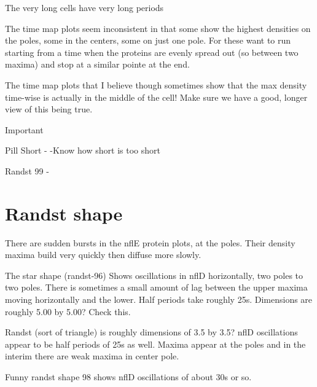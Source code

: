 \documentclass[letterpaper,twocolumn,amsmath,amssymb,pre]{revtex4-1}
\begin{document}
The very long cells have very long periods

The time map plots seem inconsistent in that some show the highest
densities on the poles, some in the centers, some on just one pole.
For these want to run starting from a time when the proteins are
evenly spread out (so between two maxima) and stop at a similar pointe
at the end.

The time map plots that I believe though sometimes show that the max
density time-wise is actually in the middle of the cell!  Make sure we
have a good, longer view of this being true.


Important


Pill Short -
     -Know how short is too short

Randst 99 -

\section{Randst shape}
There are sudden bursts in the nflE protein plots, at the poles. Their
density maxima build very quickly then diffuse more slowly. 

The star shape (randst-96) Shows oscillations in nflD horizontally, two poles to two
poles.  There is sometimes a small amount of lag between the upper
maxima moving horizontally and the lower.  Half periods take roughly
25s. Dimensions are roughly 5.00 by 5.00?  Check this.

Randst (sort of triangle) is roughly dimensions of 3.5 by 3.5?
nflD oscillations appear to be half periods of 25s as well.  Maxima appear
at the poles and in the interim there are weak maxima in center pole.

Funny randst shape 98 shows nflD oscillations of about 30s or so.
\end{document}
